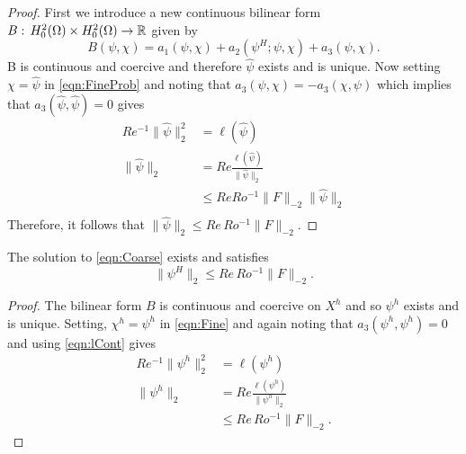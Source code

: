 \begin{proof}
  First we introduce a new continuous bilinear form $B:\, H^2_0(\Omega) \times
  H^2_0(\Omega) \to \mathbb{R}$ given by
  \begin{equation*}
    B(\psi,\chi) = a_1(\psi,\chi) + a_2(\psi^H;\psi,\chi) + a_3(\psi,\chi).
  \end{equation*}
  B is continuous and coercive and therefore $\hat{\psi}$ exists and is unique.
  Now setting $\chi=\hat{\psi}$ in \eqref{eqn:FineProb} and noting that
  $a_3(\psi,\chi) = -a_3(\chi,\psi)$ which implies that
  $a_3(\hat{\psi},\hat{\psi}) = 0$ gives
  \begin{align*}
    Re^{-1} \|\hat{\psi}\|_2^2 &= \ell(\hat{\psi}) \\
    \|\hat{\psi}\|_2 &= Re \frac{\ell(\hat{\psi})}{\|\hat{\psi}\|_2} \\
    &\le Re Ro^{-1} \|F\|_{-2}\|\hat{\psi}\|_2 \\
  \end{align*}
  Therefore, it follows that $\|\hat{\psi}\|_2 \le Re\, Ro^{-1} \|F\|_{-2}$.
\end{proof}
\begin{lemma} \label{lma:Fineh}
  The solution to \eqref{eqn:Coarse} exists and satisfies
  \begin{equation*}
    \|\psi^H\|_2 \le Re\, Ro^{-1} \|F\|_{-2}.
  \end{equation*}
\end{lemma}
\begin{proof}
  The bilinear form $B$ is continuous and coercive on $X^h$ and so $\psi^h$
  exists and is unique. Setting, $\chi^h=\psi^h$ in \eqref{eqn:Fine} and again
  noting that $a_3(\psi^h,\psi^h)=0$ and using \eqref{eqn:lCont} gives
  \begin{align*}
    Re^{-1} \|\psi^h\|_2^2 &= \ell(\psi^h) \\
    \|\psi^h\|_2 &= Re \frac{\ell(\psi^h)}{\|\psi^h\|_2} \\
    &\le Re\, Ro^{-1} \|F\|_{-2}.
  \end{align*}
\end{proof}
